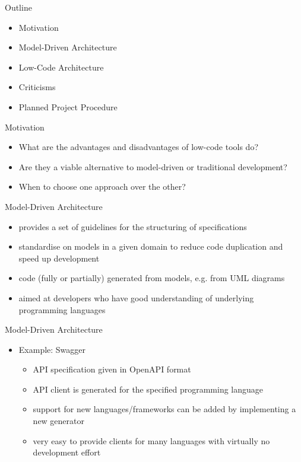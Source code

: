 \documentclass[aspectratio=169]{beamer}
\date{\formatdate{12}{01}{2021}}
\institute{supervised by Prof. Dr. Ruth Breu}
\begin{document}
  \maketitle

  \begin{frame}{Outline}
    \begin{itemize}
      \item Motivation
      \item Model-Driven Architecture
      \item Low-Code Architecture
      \item Criticisms
      \item Planned Project Procedure
    \end{itemize}
  \end{frame}

  \begin{frame}{Motivation}
    \begin{itemize}
      \item What are the advantages and disadvantages of low-code tools do?
      \item Are they a viable alternative to model-driven or traditional development?
      \item When to choose one approach over the other?
    \end{itemize}
  \end{frame}

  \begin{frame}{Model-Driven Architecture}
    \begin{itemize}
      \item provides a set of guidelines for the structuring of specifications
      \item standardise on models in a given domain to reduce code duplication and speed up development
      \item code (fully or partially) generated from models, e.g. from UML diagrams
      \item aimed at developers who have good understanding of underlying programming languages
    \end{itemize}
  \end{frame}

  \begin{frame}{Model-Driven Architecture}
    \begin{itemize}
      \item Example: Swagger
        \begin{itemize}
          \item API specification given in OpenAPI format
          \item API client is generated for the specified programming language
          \item support for new languages/frameworks can be added by implementing a new generator
          \item very easy to provide clients for many languages with virtually no development effort
        \end{itemize}
    \end{itemize}
  \end{frame}
\end{document}
